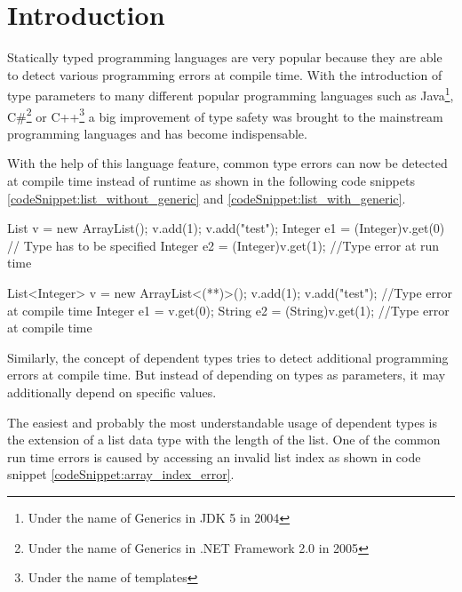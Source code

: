 \section{Introduction}\label{section:introduction}
Statically typed programming languages are very popular because they are able to detect various programming errors at compile time.
With the introduction of type parameters to many different popular programming languages such as Java\footnote{Under the name of Generics in JDK 5 in 2004\cite{JDK5}},
 C\#\footnote{Under the name of Generics in .NET Framework 2.0 in 2005\cite{dotnet20}} or C++\footnote{Under the name of templates} a big improvement of type safety was brought to the mainstream programming languages and has become indispensable.

With the help of this language feature, common type errors can now be detected at compile time instead of runtime as shown in the following code snippets \ref{codeSnippet:list_without_generic} and \ref{codeSnippet:list_with_generic}.

\begin{adjustbox}{width=\columnwidth}
\begin{codesnippet}[caption={List without generic argument}, label={codeSnippet:list_without_generic}]
List v = new ArrayList();
v.add(1);
v.add("test");
Integer e1 = (Integer)v.get(0) // Type has to be specified
Integer e2 = (Integer)v.get(1); //Type error at run time
\end{codesnippet}
\end{adjustbox}
\begin{adjustbox}{width=\columnwidth}
\begin{codesnippet}[escapeinside={(*}{*)}, caption={List with type argument}, label={codeSnippet:list_with_generic}]
List<Integer> v = new ArrayList<(**)>();
v.add(1);
v.add("test"); //Type error at compile time
Integer e1 = v.get(0);
String e2 = (String)v.get(1); //Type error at compile time
\end{codesnippet}
\end{adjustbox}

Similarly, the concept of dependent types tries to detect additional programming errors at compile time.
But instead of depending on types as parameters, it may additionally depend on specific values. 

The easiest and probably the most understandable usage of dependent types is the extension of a list data type with the length of the list. 
One of the common run time errors is caused by accessing an invalid list index as shown in code snippet \ref{codeSnippet:array_index_error}.

